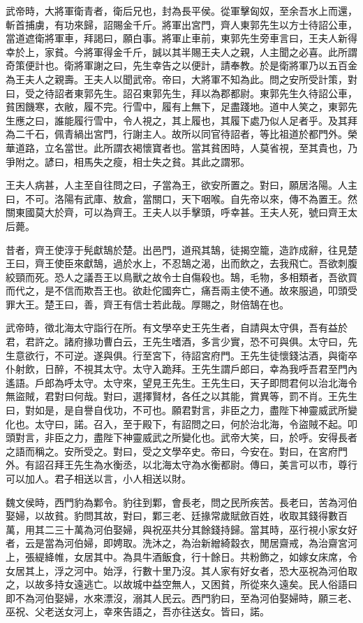 武帝時，大將軍衛青者，衛后兄也，封為長平侯。從軍擊匈奴，至余吾水上而還，斬首捕虜，有功來歸，詔賜金千斤。將軍出宮門，齊人東郭先生以方士待詔公車，當道遮衛將軍車，拜謁曰，願白事。將軍止車前，東郭先生旁車言曰，王夫人新得幸於上，家貧。今將軍得金千斤，誠以其半賜王夫人之親，人主聞之必喜。此所謂奇策便計也。衛將軍謝之曰，先生幸告之以便計，請奉教。於是衛將軍乃以五百金為王夫人之親壽。王夫人以聞武帝。帝曰，大將軍不知為此。問之安所受計策，對曰，受之待詔者東郭先生。詔召東郭先生，拜以為郡都尉。東郭先生久待詔公車，貧困饑寒，衣敝，履不完。行雪中，履有上無下，足盡踐地。道中人笑之，東郭先生應之曰，誰能履行雪中，令人視之，其上履也，其履下處乃似人足者乎。及其拜為二千石，佩青緺出宮門，行謝主人。故所以同官待詔者，等比祖道於都門外。榮華道路，立名當世。此所謂衣褐懷寶者也。當其貧困時，人莫省視，至其貴也，乃爭附之。諺曰，相馬失之瘦，相士失之貧。其此之謂邪。

王夫人病甚，人主至自往問之曰，子當為王，欲安所置之。對曰，願居洛陽。人主曰，不可。洛陽有武庫、敖倉，當關口，天下咽喉。自先帝以來，傳不為置王。然關東國莫大於齊，可以為齊王。王夫人以手擊頭，呼幸甚。王夫人死，號曰齊王太后薨。

昔者，齊王使淳于髡獻鵠於楚。出邑門，道飛其鵠，徒揭空籠，造詐成辭，往見楚王曰，齊王使臣來獻鵠，過於水上，不忍鵠之渴，出而飲之，去我飛亡。吾欲刺腹絞頸而死。恐人之議吾王以鳥獸之故令士自傷殺也。鵠，毛物，多相類者，吾欲買而代之，是不信而欺吾王也。欲赴佗國奔亡，痛吾兩主使不通。故來服過，叩頭受罪大王。楚王曰，善，齊王有信士若此哉。厚賜之，財倍鵠在也。

武帝時，徵北海太守詣行在所。有文學卒史王先生者，自請與太守俱，吾有益於君，君許之。諸府掾功曹白云，王先生嗜酒，多言少實，恐不可與俱。太守曰，先生意欲行，不可逆。遂與俱。行至宮下，待詔宮府門。王先生徒懷錢沽酒，與衛卒仆射飲，日醉，不視其太守。太守入跪拜。王先生謂戶郎曰，幸為我呼吾君至門內遙語。戶郎為呼太守。太守來，望見王先生。王先生曰，天子即問君何以治北海令無盜賊，君對曰何哉。對曰，選擇賢材，各任之以其能，賞異等，罰不肖。王先生曰，對如是，是自譽自伐功，不可也。願君對言，非臣之力，盡陛下神靈威武所變化也。太守曰，諾。召入，至于殿下，有詔問之曰，何於治北海，令盜賊不起。叩頭對言，非臣之力，盡陛下神靈威武之所變化也。武帝大笑，曰，於呼。安得長者之語而稱之。安所受之。對曰，受之文學卒史。帝曰，今安在。對曰，在宮府門外。有詔召拜王先生為水衡丞，以北海太守為水衡都尉。傳曰，美言可以市，尊行可以加人。君子相送以言，小人相送以財。

魏文侯時，西門豹為鄴令。豹往到鄴，會長老，問之民所疾苦。長老曰，苦為河伯娶婦，以故貧。豹問其故，對曰，鄴三老、廷掾常歲賦斂百姓，收取其錢得數百萬，用其二三十萬為河伯娶婦，與祝巫共分其餘錢持歸。當其時，巫行視小家女好者，云是當為河伯婦，即娉取。洗沐之，為治新繒綺縠衣，閒居齋戒，為治齋宮河上，張緹絳帷，女居其中。為具牛酒飯食，行十餘日。共粉飾之，如嫁女床席，令女居其上，浮之河中。始浮，行數十里乃沒。其人家有好女者，恐大巫祝為河伯取之，以故多持女遠逃亡。以故城中益空無人，又困貧，所從來久遠矣。民人俗語曰即不為河伯娶婦，水來漂沒，溺其人民云。西門豹曰，至為河伯娶婦時，願三老、巫祝、父老送女河上，幸來告語之，吾亦往送女。皆曰，諾。

